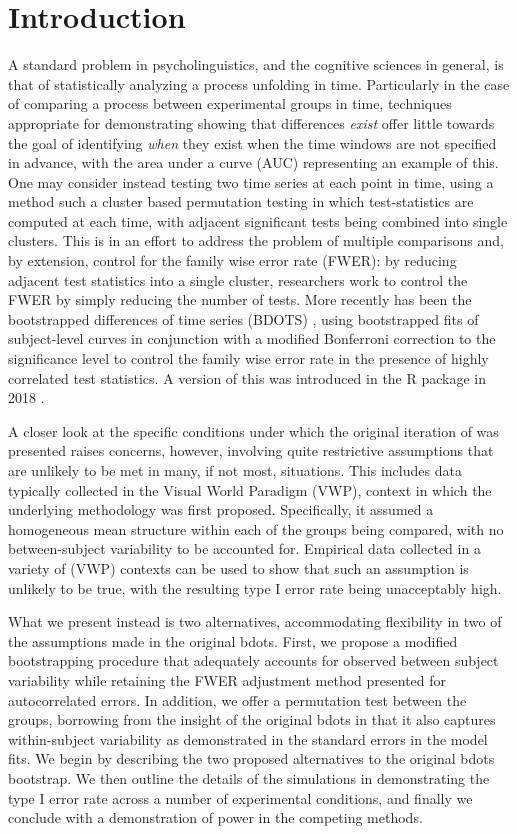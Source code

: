 \section{Introduction}

A standard problem in psycholinguistics, and the cognitive sciences in general, is that of statistically analyzing a process unfolding in time. Particularly in the case of comparing a process between experimental groups in time, techniques appropriate for demonstrating showing that differences \textit{exist} offer little towards the goal of identifying \textit{when} they exist when the time windows are not specified in advance, with the area under a curve (AUC) representing an example of this. One may consider instead testing two time series at each point in time, using a method such a cluster based permutation testing \cite{Maris2007} in which test-statistics are computed at each time, with adjacent significant tests being combined into single clusters. This is in an effort to address the problem of multiple comparisons and, by extension, control for the family wise error rate (FWER): by reducing adjacent test statistics into a single cluster, researchers work to control the FWER by simply reducing the number of tests. More recently has been the bootstrapped differences of time series (BDOTS) \cite{oleson2017detecting}, using bootstrapped fits of subject-level curves in conjunction with a modified Bonferroni correction to the significance level to control the family wise error rate in the presence of highly correlated test statistics. A version of this was introduced in the R package  in 2018 \cite{seedorff2018bdots}.

A closer look at the specific conditions under which the original iteration of  was presented raises concerns, however, involving quite restrictive assumptions that are unlikely to be met in many, if not most, situations. This includes data typically collected in the Visual World Paradigm (VWP), context in which the underlying methodology was first proposed. Specifically, it assumed a homogeneous mean structure within each of the groups being compared, with no between-subject variability to be accounted for. Empirical data collected in a variety of (VWP) contexts can be used to show that such an assumption is unlikely to be true, with the resulting type I error rate being unacceptably high.

What we present instead is two alternatives, accommodating flexibility in two of the assumptions made in the original bdots. First, we propose a modified bootstrapping procedure that adequately accounts for observed between subject variability while retaining the FWER adjustment method presented for autocorrelated errors. In addition, we offer a permutation test between the groups, borrowing from the insight of the original bdots in that it also captures within-subject variability as demonstrated in the standard errors in the model fits. We begin by describing the two proposed alternatives to the original bdots bootstrap. We then outline the details of the simulations in demonstrating the type I error rate across a number of experimental conditions, and finally we conclude with a demonstration of power in the competing methods.


